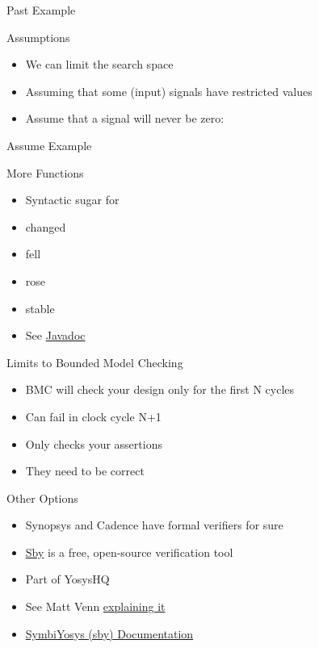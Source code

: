 \begin{frame}[fragile]{Past Example}
\end{frame}

\begin{frame}[fragile]{Assumptions}
\begin{itemize}
\item We can limit the search space
\item Assuming that some (input) signals have restricted values
\item Assume that a signal will never be zero:
\end{itemize}
\end{frame}

\begin{frame}[fragile]{Assume Example}
\end{frame}

\begin{frame}[fragile]{More Functions}
\begin{itemize}
\item Syntactic sugar for 
\item changed
\item fell
\item rose
\item stable
\item See \href{https://www.javadoc.io/doc/edu.berkeley.cs/chiseltest_2.12/latest/chiseltest/formal/index.html}{Javadoc}
\end{itemize}
\end{frame}

\begin{frame}[fragile]{Limits to Bounded Model Checking}
\begin{itemize}
\item BMC will check your design only for the first N cycles
\item Can fail in clock cycle N+1
\item Only checks your assertions
\item They need to be correct
\end{itemize}
\end{frame}

\begin{frame}[fragile]{Other Options}
\begin{itemize}
\item Synopsys and Cadence have formal verifiers for sure
\item \href{https://github.com/YosysHQ/sby}{Sby} is a free, open-source verification tool
\item Part of YosysHQ
\item See Matt Venn \href{https://www.youtube.com/watch?v=B1KX2rFJqVE}{explaining it}
\item \href{https://symbiyosys.readthedocs.io/en/latest/index.html}{SymbiYosys (sby) Documentation}
\end{itemize}
\end{frame}

